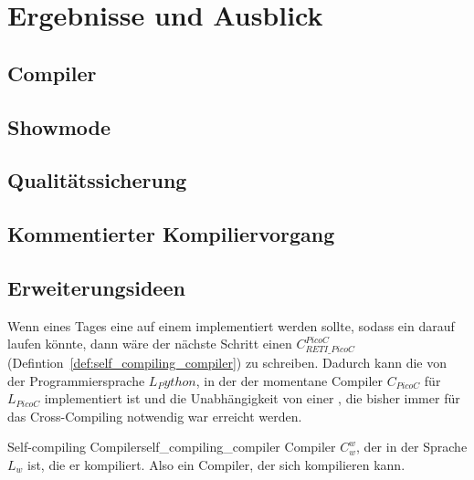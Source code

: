 \chapter{Ergebnisse und Ausblick}
\label{ch:ergebnisse_und_ausblick}

\section{Compiler}
\section{Showmode}
\section{Qualitätssicherung}
\label{sec:qualitätssicherung}
\section{Kommentierter Kompiliervorgang}
\section{Erweiterungsideen}
Wenn eines Tages eine  auf einem  implementiert werden sollte, sodass ein  darauf laufen könnte, dann wäre der nächste Schritt einen  $C_{RETI\_PicoC}^{PicoC}$ (Defintion~\ref{def:self_compiling_compiler}) zu schreiben. Dadurch kann die  von der Programmiersprache $L_Python$, in der der momentane Compiler $C_{PicoC}$ für $L_{PicoC}$ implementiert ist und die Unabhängigkeit von einer , die bisher immer für das Cross-Compiling notwendig war erreicht werden.

\begin{Definition}{Self-compiling Compiler}{self_compiling_compiler}
  Compiler $C_w^w$, der in der Sprache $L_w$  ist, die er  kompiliert. Also ein Compiler, der sich  kompilieren kann.
\end{Definition}

